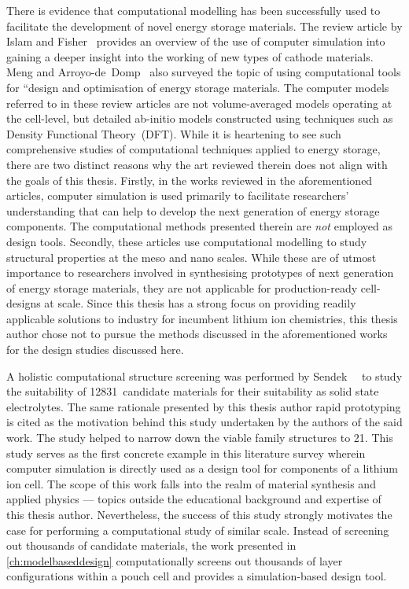 There is  evidence that  computational modelling has  been successfully  used to
facilitate the development of novel energy storage materials. The review article
by Islam and Fisher~\cite{Islam2014} provides an overview of the use of computer
simulation  into gaining  a deeper  insight  into the  working of  new types  of
cathode  materials. Meng  and Arroyo-de~Domp~\cite{Meng2009}  also surveyed  the
topic  of using  computational tools  for  ``design and  optimisation of  energy
storage materials. The computer models referred  to in these review articles are
not volume-averaged models  operating at the cell-level,  but detailed ab-initio
models  constructed using  techniques such  as Density  Functional Theory~(DFT).
While  it is  heartening  to  see such  comprehensive  studies of  computational
techniques applied to energy storage, there are two distinct reasons why the art
reviewed therein does not  align with the goals of this  thesis. Firstly, in the
works  reviewed in  the  aforementioned articles,  computer  simulation is  used
primarily  to facilitate  researchers' understanding  that can  help to  develop
the  next generation  of energy  storage components.  The computational  methods
presented  therein are  \emph{not}  employed as  design  tools. Secondly,  these
articles use computational modelling to  study structural properties at the meso
and nano scales. While these are of utmost importance to researchers involved in
synthesising prototypes of next generation of energy storage materials, they are
not applicable for production-ready cell-designs at scale. Since this thesis has
a  strong  focus on  providing  readily  applicable  solutions to  industry  for
incumbent lithium  ion chemistries, this thesis  author chose not to  pursue the
methods discussed in  the aforementioned works for the  design studies discussed
here.

A    holistic   computational    structure    screening    was   performed    by
Sendek~\etal~\cite{Sendek2017}  to  study  the  suitability  of  12831~candidate
materials for their suitability as  solid state electrolytes. The same rationale
presented  by  this thesis  author  \ie{}  rapid  prototyping  is cited  as  the
motivation behind  this study undertaken  by the authors  of the said  work. The
study  helped to  narrow down  the viable  family structures  to 21.  This study
serves as the first concrete example  in this literature survey wherein computer
simulation is  directly used as  a design tool for  components of a  lithium ion
cell. The  scope of  this work falls  into the realm  of material  synthesis and
applied  physics ---  topics outside  the educational  background and  expertise
of  this  thesis  author.  Nevertheless,  the success  of  this  study  strongly
motivates  the case  for  performing  a computational  study  of similar  scale.
Instead of  screening out thousands  of candidate materials, the  work presented
in  \cref{ch:modelbaseddesign} computationally  screens out  thousands of  layer
configurations within a pouch cell and provides a simulation-based design tool.

